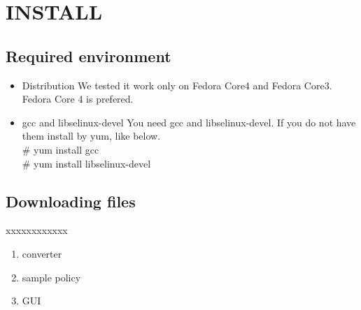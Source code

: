 \section{INSTALL}


\subsection{Required environment}
\begin{itemize}
\item Distribution 
We tested it work only on Fedora Core4 and Fedora Core3.
Fedora Core 4 is prefered.
\item gcc and libselinux-devel
You need gcc and libselinux-devel.
If you do not have them install by yum, like below.\\
\# yum install gcc\\
\# yum install libselinux-devel\\
\end{itemize}

\subsection{Downloading files}
xxxxxxxxxxxx
\begin{enumerate}
 \item converter
 \item sample policy\\
      
 \item GUI
\end{enumerate}


